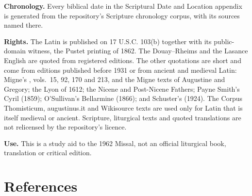 {\textbf{Chronology.} Every biblical date in the Scriptural Date and Location
appendix is generated from the repository's Scripture chronology corpus,
with its sources named there.

\textbf{Rights.} The Latin is published on 17 U.S.C. 103(b) together with its
public-domain witness, the Pustet printing of 1862. The Douay--Rheims and the
Lasance English are quoted from registered editions. The other quotations are
short and come from editions published before 1931 or from ancient and
medieval Latin: Migne's , vols.~15, 92, 170 and 213,
and the Migne texts of Augustine and Gregory; the Lyon  of
1612; the Nicene and Post-Nicene Fathers; Payne Smith's Cyril (1859);
O'Sullivan's Bellarmine (1866); and Schuster's  (1924). The
Corpus Thomisticum, augustinus.it and Wikisource texts are used only for Latin
that is itself medieval or ancient. Scripture, liturgical texts and quoted
translations are not relicensed by the repository's licence.

\textbf{Use.} This is a study aid to the 1962 Missal, not an official
liturgical book, translation or critical edition.
\par}

\section{References}
\label{sec:references}

